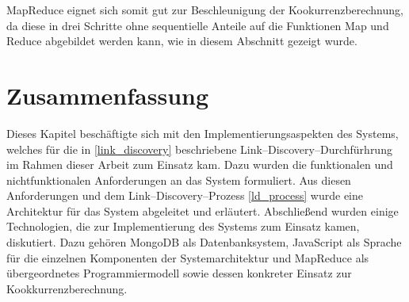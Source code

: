 MapReduce eignet sich somit gut zur Beschleunigung der Kookurrenzberechnung, da diese in drei Schritte ohne sequentielle Anteile auf die Funktionen Map und Reduce abgebildet werden kann, wie in diesem Abschnitt gezeigt wurde.

\section{Zusammenfassung}

Dieses Kapitel beschäftigte sich mit den Implementierungsaspekten des Systems, welches für die in \cref{link_discovery} beschriebene Link--Discovery--Durchfürhrung im Rahmen dieser Arbeit zum Einsatz kam. Dazu wurden die funktionalen und nichtfunktionalen Anforderungen an das System formuliert. Aus diesen Anforderungen und dem Link--Discovery--Prozess \cref{ld_process} wurde eine Architektur für das System abgeleitet und erläutert. Abschließend wurden einige Technologien, die zur Implementierung des Systems zum Einsatz kamen, diskutiert. Dazu gehören MongoDB als Datenbanksystem, JavaScript als Sprache für die einzelnen Komponenten der Systemarchitektur und MapReduce als übergeordnetes Programmiermodell sowie dessen konkreter Einsatz zur Kookkurrenzberechnung.